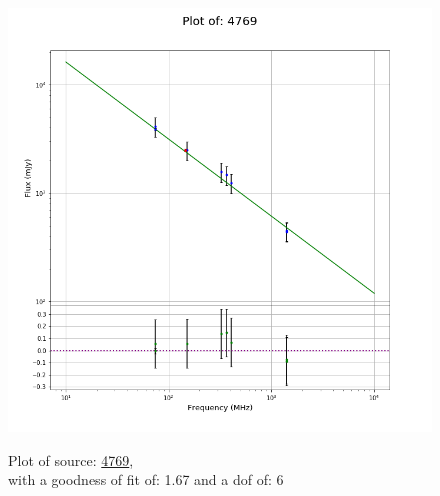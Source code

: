 \documentclass{article}
\begin{document}
\begin{figure}[H]
    \centering
    \begin{minipage}{.5\textwidth}
        \centering
        \includegraphics[scale = 0.35]{KmeulenSimSource_1hr/1hr4769.png}
        \captionsetup{labelformat=empty}
        \caption{Plot of source: \href{http://banana.transientskp.org/r4/vlo_KmeulenSimSource/runningcatalog/4769}{4769},\\with a goodness of fit of: 1.67 and a dof of: 6}
        \addtocounter{figure}{-1}
        \label{KmeulenSimSource:1hr:4769:plot}
    \end{minipage}%
    \begin{minipage}{0.5\textwidth}
        \centering


\end{minipage}
\end{figure}
\end{document}
